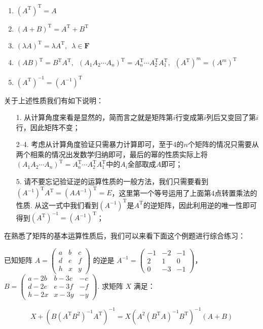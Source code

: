 \begin{enumerate}
    \item $(A^\mathrm{T})^\mathrm{T}=A$

    \item $(A+B)^\mathrm{T}=A^\mathrm{T}+B^\mathrm{T}$

    \item $(\lambda A)^\mathrm{T}=\lambda A^\mathrm{T},\enspace \lambda \in \mathbf{F}$

    \item $(AB)^\mathrm{T}=B^\mathrm{T}A^\mathrm{T},\enspace(A_1A_2\cdots A_n)^\mathrm{T}=A_n^\mathrm{T}\cdots A_2^\mathrm{T}A_1^\mathrm{T},\enspace(A^\mathrm{T})^m=(A^m)^\mathrm{T}$

    \item $(A^\mathrm{T})^{-1}=(A^{-1})^\mathrm{T}$
\end{enumerate}
关于上述性质我们有如下说明：
\begin{itemize}
    \item[1.] 从计算角度来看是显然的，简而言之就是矩阵第$i$行变成第$i$列后又变回了第$i$行，因此矩阵不变；

    \item[2--4.] 考虑从计算角度验证只需暴力计算即可，至于4的$n$个矩阵的情况只需要从两个相乘的情况出发数学归纳即可，最后的幂的性质实际上将$(A_1A_2\cdots A_n)^\mathrm{T}=A_n^\mathrm{T}\cdots A_2^\mathrm{T}A_1^\mathrm{T}$中的$A_i$全部取成$A$即可；

    \item[5.] 请不要忘记验证逆的运算性质的一般方法，我们只需要看到$(A^{-1})^\mathrm{T}A^\mathrm{T}=(AA^{-1})^\mathrm{T}=E$，这里第一个等号运用了上面第4点转置乘法的性质. 从这一式中我们看到$(A^{-1})^\mathrm{T}$是$A^\mathrm{T}$的逆矩阵，因此利用逆的唯一性即可得到$(A^\mathrm{T})^{-1}=(A^{-1})^\mathrm{T}$；
\end{itemize}

在熟悉了矩阵的基本运算性质后，我们可以来看下面这个例题进行综合练习：
\begin{example}{}{}
    已知矩阵 $A=\begin{pmatrix}a & b & c \\ d & e & f \\ h & x & y\end{pmatrix}$ 的逆是 $A^{-1}=\begin{pmatrix}-1 & -2 & -1 \\ 2 & 1 & 0 \\ 0 & -3 & -1\end{pmatrix}$，\\
    $B=\begin{pmatrix}a-2b & b-3c & -c \\ d-2e & e-3f & -f \\ h-2x & x-3y & -y\end{pmatrix}$. 求矩阵 $X$ 满足：

    \[X+\left(B(A^\mathrm{T}B^2)^{-1}A^\mathrm{T}\right)^{-1}=X\left(A^2(B^\mathrm{T}A)^{-1}B^\mathrm{T}\right)^{-1}(A+B)\]
\end{example}

